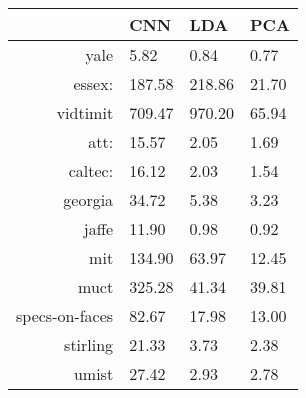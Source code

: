 \begin{tabular}{|r|l|l|l|}
  \hline
    & CNN & LDA & PCA \\
  \hline
  yale & 5.82 & 0.84 & 0.77 \\
  \hline
  essex: & 187.58 & 218.86 & 21.70 \\
  \hline
  vidtimit & 709.47 & 970.20 & 65.94 \\
  \hline
  att: & 15.57 & 2.05 & 1.69 \\
  \hline
  caltec: & 16.12 & 2.03 & 1.54 \\
  \hline
  georgia & 34.72 & 5.38 & 3.23 \\
  \hline
  jaffe & 11.90 & 0.98 & 0.92 \\
  \hline
  mit & 134.90 & 63.97 & 12.45 \\
  \hline
  muct & 325.28 & 41.34 & 39.81 \\
  \hline
  specs-on-faces & 82.67 & 17.98 & 13.00 \\
  \hline
  stirling & 21.33 & 3.73 & 2.38 \\
  \hline
  umist & 27.42 & 2.93 & 2.78 \\
  \hline
\end{tabular}
